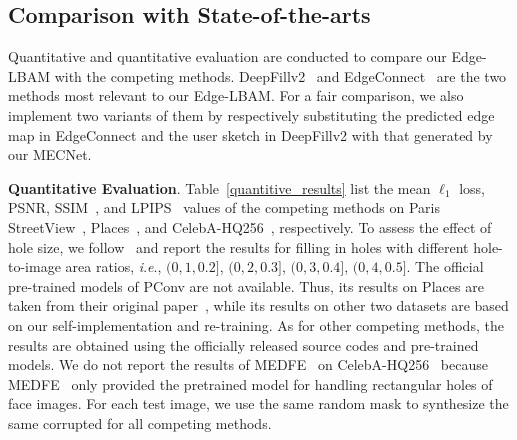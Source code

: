 \documentclass[10pt,journal,compsoc]{IEEEtran}
\newcommand{\ie}{\textit{i}.\textit{e}.}
\begin{document}
\subsection{Comparison with State-of-the-arts}\label{compare}
%
Quantitative and quantitative evaluation are conducted to compare our Edge-LBAM with the competing methods.
%
DeepFillv2~\cite{yu2018free} and EdgeConnect~\cite{nazeri2019edgeconnect} are the two methods most relevant to our Edge-LBAM.
%
For a fair comparison, we also implement two variants of them by respectively substituting the predicted edge map in EdgeConnect and the user sketch in DeepFillv2 with that generated by our MECNet.



{\textbf{Quantitative Evaluation}. }
%
Table~\ref{quantitive_results} list the mean $\ell_1$ loss, PSNR, SSIM~\cite{wang2004image}, and LPIPS~\cite{zhang2018unreasonable} values of the competing methods on Paris StreetView~\cite{doersch2015makes}, Places~\cite{zhou2017places}, and CelebA-HQ256~\cite{karras2017progressive}, respectively.
%
To assess the effect of hole size, we follow~\cite{partialconv2017} and report the results for filling in holes with different hole-to-image area ratios, \ie, $(0,1,0.2]$, $(0,2,0.3]$, $(0,3,0.4]$, $(0,4,0.5]$.
%
The official pre-trained models of PConv are not available.
%
Thus, its results on Places are taken from their original paper~\cite{partialconv2017}, while its results on other two datasets are based on our self-implementation and re-training.
%
As for other competing methods, the results are obtained using the officially released source codes and pre-trained models.
%
{We do not report the results of MEDFE~\cite{liu2020rethinking} on CelebA-HQ256~\cite{karras2017progressive} because MEDFE~\cite{liu2020rethinking} only provided the pretrained model for handling rectangular holes of face images.
%
}
%
For each test image, we use the same random mask to synthesize the same corrupted for all competing methods.
\end{document}
